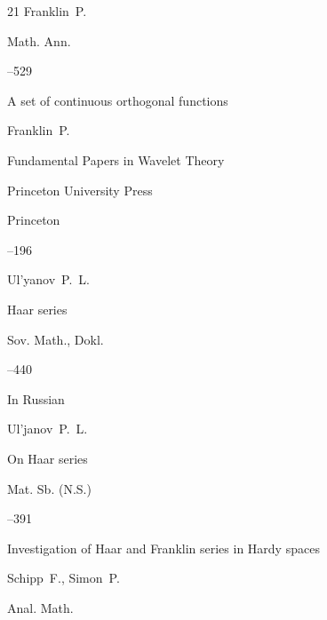 \begin{thebibliography}{21}
\by Franklin~P.

\jour Math. Ann. 




--529


\moreref

\paper A set of continuous orthogonal functions 

\by Franklin~P.

\inbook Fundamental Papers in Wavelet Theory

\publ Princeton University Press

\publaddr Princeton 


–196






\by Ul'yanov~P.~L.

\paper Haar series

\jour Sov. Math., Dokl.


--440 






\lang In Russian

\by Ul'janov~P.~L.

\paper On Haar series

\jour Mat. Sb. (N.S.) 




–391






\paper  Investigation of Haar and Franklin series in Hardy spaces 

\by Schipp~F., Simon~P. 

\jour Anal. Math. 



\end{thebibliography}
